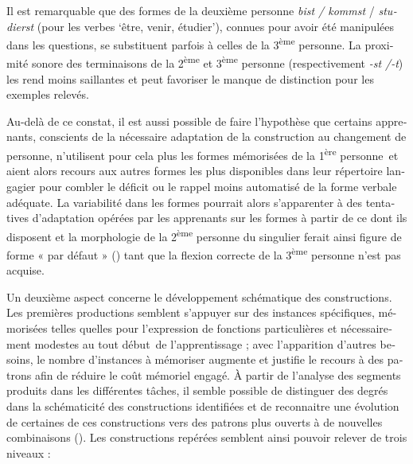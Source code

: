 \documentclass[output=paper]{langscibook}
\begin{document}
\begin{otherlanguage}{french}
Il est remarquable que des formes de la deuxième personne \textit{bist / kommst} / \textit{studierst} (pour les verbes `être, venir, étudier'), connues pour avoir été manipulées dans les questions, se substituent parfois à celles de la 3\textsuperscript{ème} personne. La proximité sonore des terminaisons de la 2\textsuperscript{ème} et 3\textsuperscript{ème} personne (respectivement \textit{-st /-t}) les rend moins saillantes et peut favoriser le manque de distinction pour les exemples relevés. 

Au-delà de ce constat, il est aussi possible de faire l’hypothèse que certains apprenants, conscients de la nécessaire adaptation de la construction au changement de personne, n’utilisent pour cela plus les formes mémorisées de la 1\textsuperscript{ère} personne~et aient alors recours aux autres formes les plus disponibles dans leur répertoire langagier pour combler le déficit ou le rappel moins automatisé de la forme verbale adéquate. La variabilité dans les formes pourrait alors s'apparenter à des tentatives d'adaptation opérées par les apprenants sur les formes à partir de ce dont ils disposent et la morphologie de la 2\textsuperscript{ème} personne du singulier ferait ainsi figure de forme « par défaut » (\citealt{vanderVelde2004}) tant que la flexion correcte de la 3\textsuperscript{ème} personne n’est pas acquise.

\begin{sloppypar}
Un deuxième aspect concerne le développement schématique des constructions. Les premières productions semblent s’appuyer sur des instances spécifiques, mémorisées telles quelles pour l’expression de fonctions particulières et nécessairement modestes au tout début~de l’apprentissage ; avec l’apparition d’autres besoins, le nombre d’instances à mémoriser augmente et justifie le recours à des patrons afin de réduire le coût mémoriel engagé. À partir de l’analyse des segments produits dans les différentes tâches, il semble possible de distinguer des degrés dans la schématicité des constructions identifiées et de reconnaitre une évolution de certaines de ces constructions vers des patrons plus ouverts à de nouvelles combinaisons (). Les constructions repérées semblent ainsi pouvoir relever de trois niveaux : 
\end{sloppypar}\largerpage


\end{otherlanguage}
\end{document}
